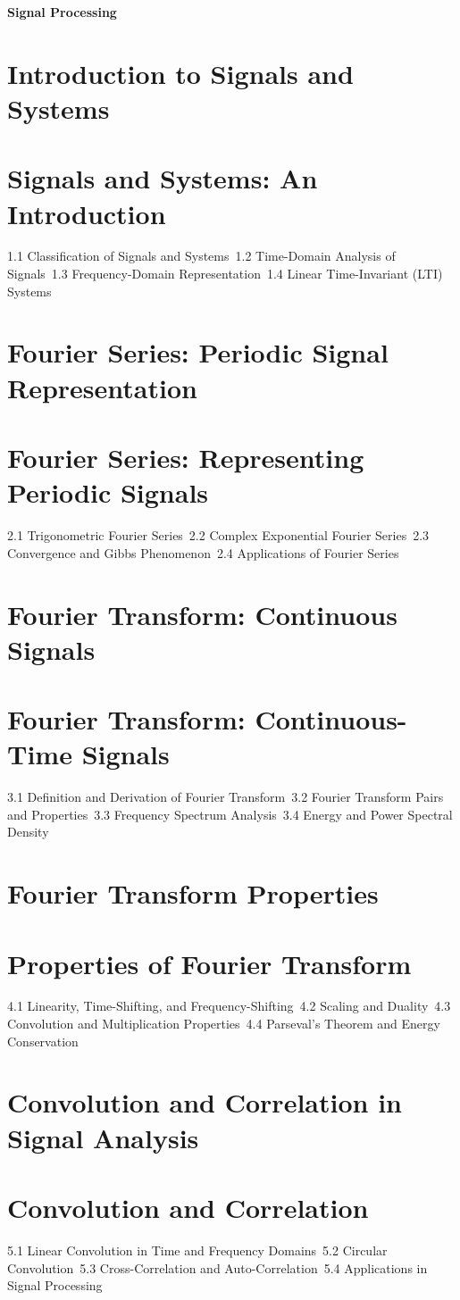 {\LARGE \bf{Signal Processing}}
\section{Introduction to Signals and Systems}
\section{Signals and Systems: An Introduction}
1.1 Classification of Signals and Systems\
1.2 Time-Domain Analysis of Signals\
1.3 Frequency-Domain Representation\
1.4 Linear Time-Invariant (LTI) Systems\
\section{Fourier Series: Periodic Signal Representation}
\section{Fourier Series: Representing Periodic Signals}
2.1 Trigonometric Fourier Series\
2.2 Complex Exponential Fourier Series\
2.3 Convergence and Gibbs Phenomenon\
2.4 Applications of Fourier Series\
\section{Fourier Transform: Continuous Signals}
\section{Fourier Transform: Continuous-Time Signals}
3.1 Definition and Derivation of Fourier Transform\
3.2 Fourier Transform Pairs and Properties\
3.3 Frequency Spectrum Analysis\
3.4 Energy and Power Spectral Density\
\section{Fourier Transform Properties}
\section{Properties of Fourier Transform}
4.1 Linearity, Time-Shifting, and Frequency-Shifting\
4.2 Scaling and Duality\
4.3 Convolution and Multiplication Properties\
4.4 Parseval's Theorem and Energy Conservation\
\section{Convolution and Correlation in Signal Analysis}
\section{Convolution and Correlation}
5.1 Linear Convolution in Time and Frequency Domains\
5.2 Circular Convolution\
5.3 Cross-Correlation and Auto-Correlation\
5.4 Applications in Signal Processing\
